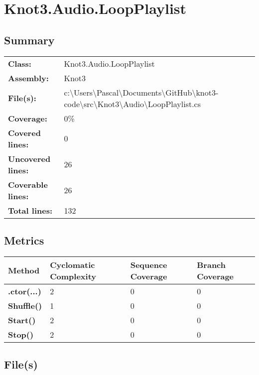 \documentclass[a4paper,10pt]{article}
\begin{document}
\section{Knot3.Audio.LoopPlaylist}
\subsection{Summary}
\begin{longtable}[l]{ll}
\textbf{Class:} & Knot3.Audio.LoopPlaylist\\
\textbf{Assembly:} & Knot3\\
\textbf{File(s):} & \begin{minipage}[t]{12cm}{c:\textbackslash Users\textbackslash Pascal\textbackslash Documents\textbackslash GitHub\textbackslash knot3-code\textbackslash src\textbackslash Knot3\textbackslash Audio\textbackslash LoopPlaylist.cs}\end{minipage} \\
\textbf{Coverage:} & 0\%\\
\textbf{Covered lines:} & 0\\
\textbf{Uncovered lines:} & 26\\
\textbf{Coverable lines:} & 26\\
\textbf{Total lines:} & 132\\
\end{longtable}
\subsection{Metrics}
\begin{longtable}[l]{|l|l|l|l|}
\hline
\textbf{Method} & \textbf{Cyclomatic Complexity} & \textbf{Sequence Coverage} & \textbf{Branch Coverage}\\
\hline
\textbf{.ctor(...)} & 2 & 0 & 0\\
\hline
\textbf{Shuffle()} & 1 & 0 & 0\\
\hline
\textbf{Start()} & 2 & 0 & 0\\
\hline
\textbf{Stop()} & 2 & 0 & 0\\
\hline
\end{longtable}
\subsection{File(s)}
\end{document}
